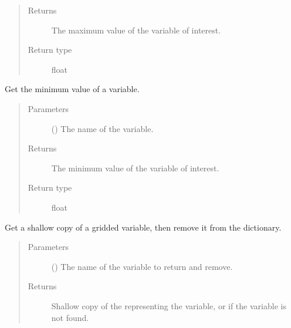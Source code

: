 \documentclass[letterpaper,10pt,english]{sphinxmanual}
\begin{document}
\begin{fulllineitems}
\begin{fulllineitems}
\begin{quote}
\begin{description}
\item[{Returns}] \leavevmode
The maximum value of the variable of interest.

\item[{Return type}] \leavevmode
float

\end{description}\end{quote}

\end{fulllineitems}


\begin{fulllineitems}
\label{\detokenize{api:storages.grid_data.GridData.get_min}}
Get the minimum value of a variable.
\begin{quote}\begin{description}
\item[{Parameters}] \leavevmode
{} () \textendash{} The name of the variable.

\item[{Returns}] \leavevmode
The minimum value of the variable of interest.

\item[{Return type}] \leavevmode
float

\end{description}\end{quote}

\end{fulllineitems}


\begin{fulllineitems}
\label{\detokenize{api:storages.grid_data.GridData.pop}}
Get a shallow copy of a gridded variable, then remove it from the dictionary.
\begin{quote}\begin{description}
\item[{Parameters}] \leavevmode
{} () \textendash{} The name of the variable to return and remove.

\item[{Returns}] \leavevmode
Shallow copy of the  representing the variable, or  if the variable is not found.


\end{description}
\end{quote}
\end{fulllineitems}
\end{fulllineitems}
\end{document}
